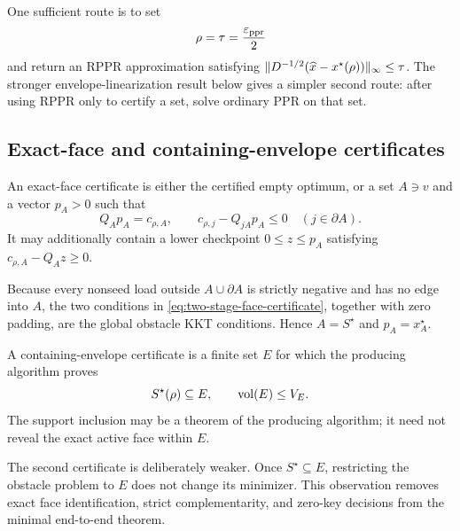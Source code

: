 One sufficient route is to set
\begin{equation}
 \rho=\tau=\frac{\varepsilon_{\mathrm{ppr}}}{2}
 \label{eq:two-stage-split}
\end{equation}
and return an RPPR approximation satisfying
$\lVert D^{-1/2}(\widehat x-x^\star(\rho))\rVert_\infty\leq\tau$.
The stronger envelope-linearization result below gives a simpler second
route: after using RPPR only to certify a set, solve ordinary PPR on that set.

\subsection{Exact-face and containing-envelope certificates}

\begin{definition}
\label{def:two-stage-face-certificate}
An exact-face certificate is either the certified empty optimum, or a set
$A\ni v$ and a vector $p_A>0$ such that
\begin{equation}
 Q_Ap_A=c_{\rho,A},
 \qquad
 c_{\rho,j}-Q_{jA}p_A\leq0\quad(j\in\partial A).
 \label{eq:two-stage-face-certificate}
\end{equation}
It may additionally contain a lower checkpoint $0\leq z\leq p_A$ satisfying
$c_{\rho,A}-Q_Az\geq0$.
\end{definition}

Because every nonseed load outside $A\cup\partial A$ is strictly negative
and has no edge into $A$, the two conditions in
\cref{eq:two-stage-face-certificate}, together with zero padding, are the
global obstacle KKT conditions.  Hence $A=S^\star$ and $p_A=x_A^\star$.

\begin{definition}
\label{def:two-stage-envelope-certificate}
A containing-envelope certificate is a finite set $E$ for which the
producing algorithm proves
\begin{equation}
 S^\star(\rho)\subseteq E,
 \qquad
 \operatorname{vol}(E)\leq V_E.
 \label{eq:two-stage-envelope-certificate}
\end{equation}
The support inclusion may be a theorem of the producing algorithm; it need
not reveal the exact active face within $E$.
\end{definition}

The second certificate is deliberately weaker.  Once
$S^\star\subseteq E$, restricting the obstacle problem to $E$ does not change
its minimizer.  This observation removes exact face identification, strict
complementarity, and zero-key decisions from the minimal end-to-end theorem.

